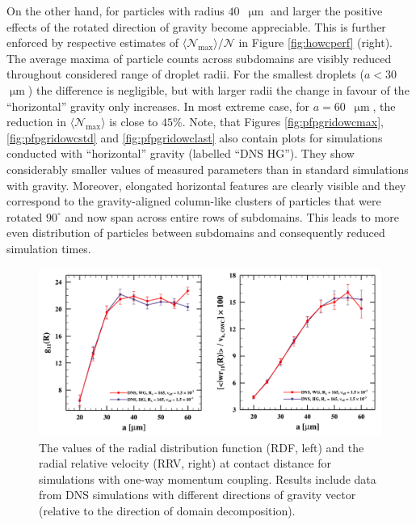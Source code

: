 \documentclass{pracamgren}
\begin{document}
On the other hand, for particles with radius $40$~$\upmu\text{m}$ and larger the positive effects of the rotated direction of gravity become appreciable.
This is further enforced by respective estimates of $\langle \mathcal{N}_{\max} \rangle / \mathcal{N}$ in Figure \ref{fig:howcperf} (right).
The average maxima of particle counts across subdomains are visibly reduced throughout considered range of droplet radii.
For the smallest droplets (${a < 30}$~$\upmu\text{m}$) the difference is negligible, but with larger radii the change in favour of the ``horizontal'' gravity only increases.
In most extreme case, for ${a = 60}$~$\upmu\text{m}$, the reduction in $\langle \mathcal{N}_{\max} \rangle$ is close to $45 \%$.
Note, that Figures \ref{fig:pfpgridowcmax}, \ref{fig:pfpgridowcstd} and \ref{fig:pfpgridowclast} also contain plots for simulations conducted with ``horizontal'' gravity (labelled ``DNS HG'').
They show considerably smaller values of measured parameters than in standard simulations with gravity.
Moreover, elongated horizontal features are clearly visible and they correspond to the gravity-aligned column-like clusters of particles that were rotated $90^{\circ}$ and now span across entire rows of subdomains.
This leads to more even distribution of particles between subdomains and consequently reduced simulation times.

\begin{figure}[!h]
\centering
\includegraphics[width=13.5cm]{figures/3-22_howcrdfrrv.pdf}
\caption{
The values of the radial distribution function (RDF, left) and the radial relative velocity (RRV, right) at contact distance for simulations with one-way momentum coupling.
Results include data from DNS simulations with different directions of gravity vector (relative to the direction of domain decomposition).
}
\label{fig:howcrdfrrv}
\end{figure}
\end{document}

